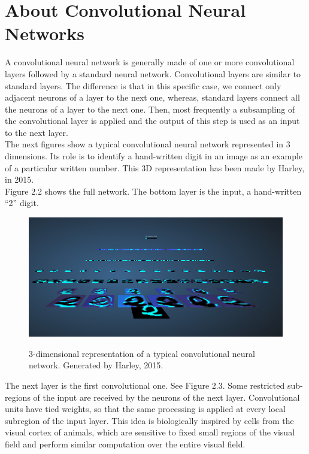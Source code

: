 \section{About Convolutional Neural Networks}

A convolutional neural network is generally made of one or more convolutional layers followed by a standard neural network.
Convolutional layers are similar to standard layers. The difference is that in this specific case, we connect only adjacent neurons of a layer to the next one, whereas, standard layers connect all the neurons of a layer to the next one. Then, most frequently a subsampling of the convolutional layer is applied and the output of this step is used as an input to the next layer.\\

The next figures show a typical convolutional neural network represented in 3 dimensions. Its role is to identify a hand-written digit in an image as an example of a particular written number. This 3D representation has been made by Harley, in 2015.\\

Figure 2.2 shows the full network. The bottom layer is the input, a hand-written \enquote{2} digit.


\begin{figure}[!ht]
  \centering
  \includegraphics[scale=0.5]{figures/conv1.png}  
  \caption[3-dimensional representation of a typical convolutional neural network. Generated by Harley, 2015.]{3-dimensional representation of a typical convolutional neural network. Generated by Harley, 2015.}
  \protect\label{fig:conv1}
\end{figure}
\FloatBarrier

The next layer is the first convolutional one. See Figure 2.3. Some restricted sub-regions of the input are received by the neurons of the next layer. Convolutional units have tied weights, so that the same processing is applied at every local subregion of the input layer. This idea is biologically inspired by cells from the visual cortex of animals, which are sensitive to fixed small regions of the visual field and perform similar computation over the entire visual field.

